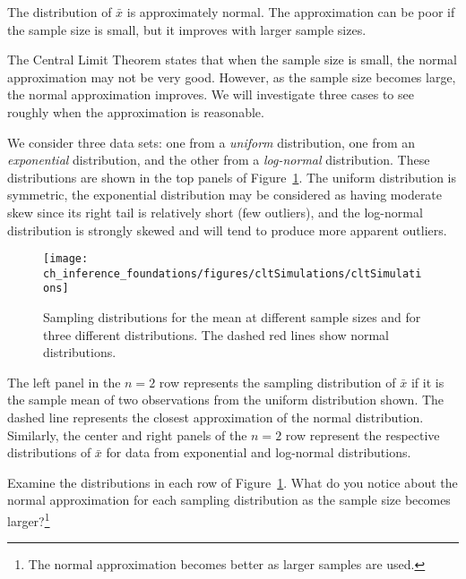 \begin{termBox}{
The distribution of $\bar{x}$ is approximately normal. The approximation can be poor if the sample size is small, but it improves with larger sample sizes.}
\end{termBox}

The Central Limit Theorem states that when the sample size is small, the normal approximation may not be very good. However, as the sample size becomes large, the normal approximation improves. We will investigate three cases to see roughly when the approximation is reasonable.

We consider three data sets: one from a \emph{uniform} distribution, one from an \emph{exponential} distribution, and the other from a \emph{log-normal} distribution. These distributions are shown in the top panels of Figure~\ref{cltSimulations}. The uniform distribution is symmetric, the exponential distribution may be considered as having moderate skew since its right tail is relatively short (few outliers), and the log-normal distribution is strongly skewed and will tend to produce more apparent outliers.

\begin{figure}
   \centering
   \texttt{[image: ch\_inference\_foundations/figures/cltSimulations/cltSimulations]}
   \caption{Sampling distributions for the mean at different sample sizes and for three different distributions. The dashed red lines show normal distributions.}
   \label{cltSimulations}
\end{figure}

The left panel in the $n=2$ row represents the sampling distribution of $\bar{x}$ if it is the sample mean of two observations from the uniform distribution shown. The dashed line represents the closest approximation of the normal distribution. Similarly, the center and right panels of the $n=2$ row represent the respective distributions of $\bar{x}$ for data from exponential and log-normal distributions.

\begin{exercise}
Examine the distributions in each row of Figure~\ref{cltSimulations}. What do you notice about the normal approximation for each sampling distribution as the sample size becomes larger?\footnote{The normal approximation becomes better as larger samples are used.}
\end{exercise}

